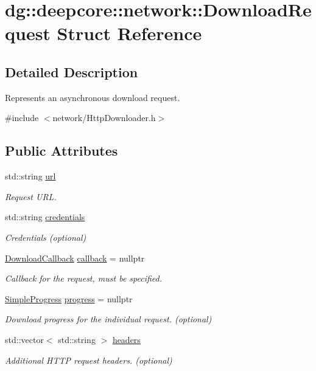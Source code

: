 \hypertarget{structdg_1_1deepcore_1_1network_1_1_download_request}{}\section{dg\+:\+:deepcore\+:\+:network\+:\+:Download\+Request Struct Reference}
\label{structdg_1_1deepcore_1_1network_1_1_download_request}


\subsection{Detailed Description}
Represents an asynchronous download request. 

{\ttfamily \#include $<$network/\+Http\+Downloader.\+h$>$}

\subsection*{Public Attributes}
\begin{DoxyCompactItemize}
\item 
std\+::string \hyperlink{structdg_1_1deepcore_1_1network_1_1_download_request_a27a77bb34f9c7a50280643a7f5642645}{url}
\begin{DoxyCompactList}\small\item\em Request U\+RL. \end{DoxyCompactList}\item 
std\+::string \hyperlink{structdg_1_1deepcore_1_1network_1_1_download_request_a658bf11041a4e59708e11a03586a3cc8}{credentials}
\begin{DoxyCompactList}\small\item\em Credentials (optional) \end{DoxyCompactList}\item 
\hyperlink{group___network_module_ga4d618c88e9b1e6e961f70621dc9aab41}{Download\+Callback} \hyperlink{structdg_1_1deepcore_1_1network_1_1_download_request_adb453a945c53898c25e110d81c0d2369}{callback} = nullptr
\begin{DoxyCompactList}\small\item\em Callback for the request, must be specified. \end{DoxyCompactList}\item 
\hyperlink{group___utility_module_ga6763018df79e4bdbcd8cd14cea5342b2}{Simple\+Progress} \hyperlink{structdg_1_1deepcore_1_1network_1_1_download_request_ac2c22b1c491ff60d2ac5e15419b1b04b}{progress} = nullptr
\begin{DoxyCompactList}\small\item\em Download progress for the individual request. (optional) \end{DoxyCompactList}\item 
std\+::vector$<$ std\+::string $>$ \hyperlink{structdg_1_1deepcore_1_1network_1_1_download_request_a155aa5c32169a6bf6d47fec321672f4e}{headers}
\begin{DoxyCompactList}\small\item\em Additional H\+T\+TP request headers. (optional) \end{DoxyCompactList}\end{DoxyCompactItemize}


